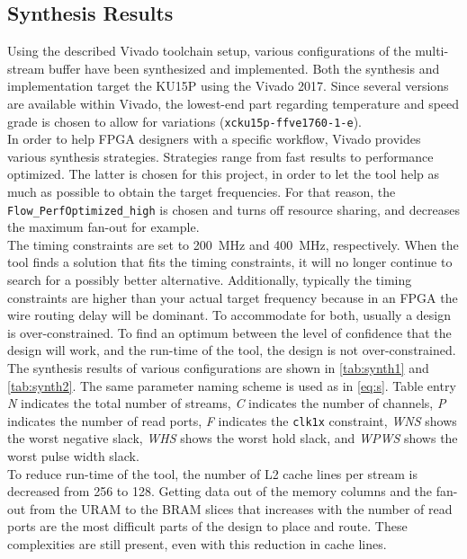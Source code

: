 \subsection{Synthesis Results}
Using the described Vivado toolchain setup, various configurations of the multi-stream buffer have been synthesized and implemented. Both the synthesis and implementation target the KU15P using the Vivado 2017. Since several versions are available within Vivado, the lowest-end part regarding temperature and speed grade is chosen to allow for variations (\texttt{xcku15p-ffve1760-1-e}).\\
In order to help FPGA designers with a specific workflow, Vivado provides various synthesis strategies. Strategies range from fast results to performance optimized. The latter is chosen for this project, in order to let the tool help as much as possible to obtain the target frequencies. For that reason, the \texttt{Flow\_PerfOptimized\_high} is chosen and turns off resource sharing, and decreases the maximum fan-out for example.\\
The timing constraints are set to \SI{200}{\mega\hertz} and \SI{400}{\mega\hertz}, respectively. When the tool finds a solution that fits the timing constraints, it will no longer continue to search for a possibly better alternative. Additionally, typically the timing constraints are higher than your actual target frequency because in an FPGA the wire routing delay will be dominant. To accommodate for both, usually a design is over-constrained. To find an optimum between the level of confidence that the design will work, and the run-time of the tool, the design is not over-constrained.\\
The synthesis results of various configurations are shown in \autoref{tab:synth1} and \autoref{tab:synth2}. The same parameter naming scheme is used as in \autoref{eq:s}. Table entry \textit{N} indicates the total number of streams, \textit{C} indicates the number of channels, \textit{P} indicates the number of read ports, \textit{F} indicates the \texttt{clk1x} constraint, \textit{WNS} shows the worst negative slack, \textit{WHS} shows the worst hold slack, and \textit{WPWS} shows the worst pulse width slack.\\
To reduce run-time of the tool, the number of L2 cache lines per stream is decreased from 256 to 128. Getting data out of the memory columns and the fan-out from the URAM to the BRAM slices that increases with the number of read ports are the most difficult parts of the design to place and route. These complexities are still present, even with this reduction in cache lines.

